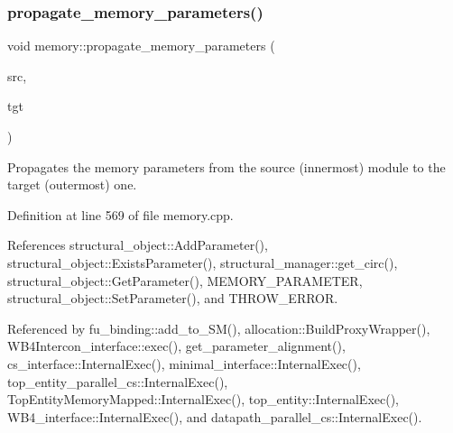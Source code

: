 \subsubsection{\texorpdfstring{propagate\+\_\+memory\+\_\+parameters()}{propagate\_memory\_parameters()}}
{\footnotesize\ttfamily void memory\+::propagate\+\_\+memory\+\_\+parameters (\begin{DoxyParamCaption}\item[{const \hyperlink{structural__objects_8hpp_a8ea5f8cc50ab8f4c31e2751074ff60b2}{structural\+\_\+object\+Ref}}]{src,  }\item[{const \hyperlink{structural__manager_8hpp_ab3136f0e785d8535f8d252a7b53db5b5}{structural\+\_\+manager\+Ref}}]{tgt }\end{DoxyParamCaption})\hspace{0.3cm}{\ttfamily [static]}}



Propagates the memory parameters from the source (innermost) module to the target (outermost) one. 



Definition at line 569 of file memory.\+cpp.



References structural\+\_\+object\+::\+Add\+Parameter(), structural\+\_\+object\+::\+Exists\+Parameter(), structural\+\_\+manager\+::get\+\_\+circ(), structural\+\_\+object\+::\+Get\+Parameter(), M\+E\+M\+O\+R\+Y\+\_\+\+P\+A\+R\+A\+M\+E\+T\+ER, structural\+\_\+object\+::\+Set\+Parameter(), and T\+H\+R\+O\+W\+\_\+\+E\+R\+R\+OR.



Referenced by fu\+\_\+binding\+::add\+\_\+to\+\_\+\+S\+M(), allocation\+::\+Build\+Proxy\+Wrapper(), W\+B4\+Intercon\+\_\+interface\+::exec(), get\+\_\+parameter\+\_\+alignment(), cs\+\_\+interface\+::\+Internal\+Exec(), minimal\+\_\+interface\+::\+Internal\+Exec(), top\+\_\+entity\+\_\+parallel\+\_\+cs\+::\+Internal\+Exec(), Top\+Entity\+Memory\+Mapped\+::\+Internal\+Exec(), top\+\_\+entity\+::\+Internal\+Exec(), W\+B4\+\_\+interface\+::\+Internal\+Exec(), and datapath\+\_\+parallel\+\_\+cs\+::\+Internal\+Exec().

